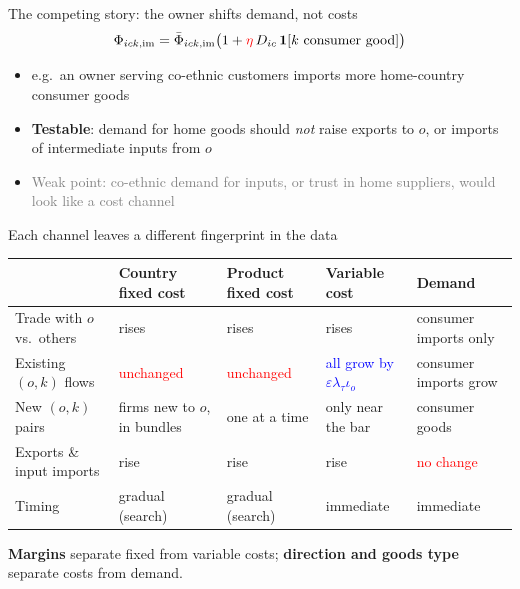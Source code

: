 \documentclass[notes,11pt, aspectratio=169]{beamer}
\begin{document}
\begin{frame}{The competing story: the owner shifts demand, not costs}
\[
\Phi_{ick,\mathrm{im}}=\bar\Phi_{ick,\mathrm{im}}\big(1+\textcolor{red}{\eta}\,D_{ic}\,\mathbbm{1}[k\ \text{consumer good}]\big)
\]
\begin{itemize}
\item e.g.\ an owner serving co-ethnic customers imports more home-country consumer goods
\item<2-> \textbf{Testable}: demand for home goods should \emph{not} raise exports to $o$, or imports of intermediate inputs from $o$
\item<3-> \textcolor{gray}{Weak point: co-ethnic demand for inputs, or trust in home suppliers, would look like a cost channel}
\end{itemize}
\end{frame}


\begin{frame}[label=fingerprints]{Each channel leaves a different fingerprint in the data}
\footnotesize
\renewcommand{\arraystretch}{1.3}
\begin{tabularx}{\textwidth}{@{}>{\raggedright\arraybackslash}p{3.3cm}YYYY@{}}
\toprule
 & \textbf{Country fixed cost} & \textbf{Product fixed cost} & \textbf{Variable cost} & \textbf{Demand}\\
\midrule
Trade with $o$ vs.\ others & rises & rises & rises & consumer imports only\\
Existing $(o,k)$ flows & \textcolor{red}{unchanged} & \textcolor{red}{unchanged} & \textcolor{blue}{all grow by $\varepsilon\lambda_\tau\iota_o$} & consumer imports grow\\
New $(o,k)$ pairs & firms new to $o$, in bundles & one at a time & only near the bar & consumer goods\\
Exports \& input imports & rise & rise & rise & \textcolor{red}{no change}\\
Timing & gradual (search) & gradual (search) & immediate & immediate\\
\bottomrule
\end{tabularx}
\vspace{0.2cm}

\normalsize
\textbf{Margins} separate fixed from variable costs; \textbf{direction and goods type} separate costs from demand.
\end{frame}
\end{document}
